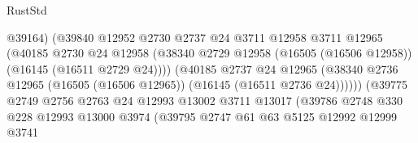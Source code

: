 \begin{lexlean}{RustStd}
\begin{coremodule}
                                          @39164)
                                        (@39840
                                          @12952
                                          @2730
                                          @2737
                                          @24
                                          @3711
                                          @12958
                                          @3711
                                          @12965
                                          (@40185
                                            @2730
                                            @24
                                            @12958
                                            (@38340
                                              @2729
                                              @12958
                                              (@16505 (@16506 @12958))
                                              (@16145 (@16511 @2729 @24))))
                                          (@40185
                                            @2737
                                            @24
                                            @12965
                                            (@38340
                                              @2736
                                              @12965
                                              (@16505 (@16506 @12965))
                                              (@16145 (@16511 @2736 @24))))))
                                      (@39775
                                        @2749
                                        @2756
                                        @2763
                                        @24
                                        @12993
                                        @13002
                                        @3711
                                        @13017
                                        (@39786
                                          @2748
                                          @330
                                          @228
                                          @12993
                                          @13000
                                          @3974
                                          (@39795
                                            @2747
                                            @61
                                            @63
                                            @5125
                                            @12992
                                            @12999
                                            @3741

\end{coremodule}
\end{lexlean}
